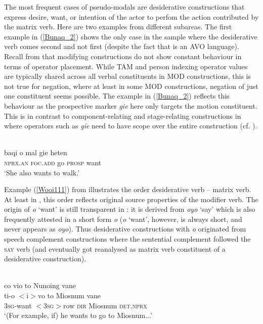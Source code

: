 The most frequent cases of pseudo-modals are desiderative constructions that express desire, want, or intention of the actor to perfom the action contributed by the matrix verb. Here are two examples from different subareas. The first example in (\ref{Bunaq_2}) shows the only case in the sample where the desiderative verb comes second and not first (despite the fact that  is an AVO language). Recall from  that modifying constructions do not show constant behaviour in terms of operator placement. While TAM and person indexing operator values are typically shared across all verbal constituents in MOD constructions, this is not true for negation, where at least in some MOD constructions, negation of just one constituent seems possible. The  example in (\ref{Bunaq_2}) reflects this behaviour as the prospective marker \textit{gie} here only targets the motion constituent. This is in contrast to component-relating and stage-relating constructions in  where operators such as \textit{gie} need to have scope over the entire construction (cf. \citealt[443f.]{schapper2009bunaq}).

\ea \label{Bunaq_2}
\\
\gll baqi o mal gie heten \\
\textsc{nprx}.\textsc{an} \textsc{foc}.\textsc{add} go \textsc{prosp} want \\
\glft `She also wants to walk.’\\ 
\z

Example (\ref{Wooi111}) from  illustrates the order desiderative verb -- matrix verb. At least in , this order reflects  original source properties of the modifier verb. The origin of \textit{o} `want' is still transparent in : it is derived from \textit{oyo} `say' which is also frequently attested in a short form \textit{o} (\textit{o} `want', however, is always short, and never appears as \textit{oyo}). Thus desiderative constructions with \textit{o} originated from speech complement constructions where the sentential complement followed the \textsc{say} verb (and eventually got reanalysed as matrix verb constituent of a desiderative construction).

\ea \label{Wooi111}
\\
\glll co vio to Nunoing vane \\
ti-o $<$i$>$vo to Miosnum vane \\
3\textsc{sg}-want $<$3\textsc{sg}$>$row \textsc{dir} Miosnum \textsc{det}.\textsc{nprx} \\
\glft `(For example, if) he wants to go to Miosnum...'\\ 
\z

